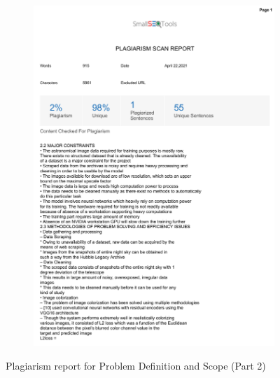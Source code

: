 \documentclass[oneside,a4paper,12pt]{report}
\begin{document}
\begin{appendices}
\begin{figure}
	\begin{subfigure}[H]{\textwidth}
		\centering
    	\includegraphics[scale=0.7, page=1]{plagiarism/problem_definition&scope_2.pdf}
    \end{subfigure}
 \caption{Plagiarism report for Problem Definition and Scope (Part 2)}
    \label{PlagiarismPDS2}
\end{figure}
\begin{figure}\ContinuedFloat
    \begin{subfigure}[H]{\textwidth}
    	\centering

\end{subfigure}
\end{figure}
\end{appendices}
\end{document}
